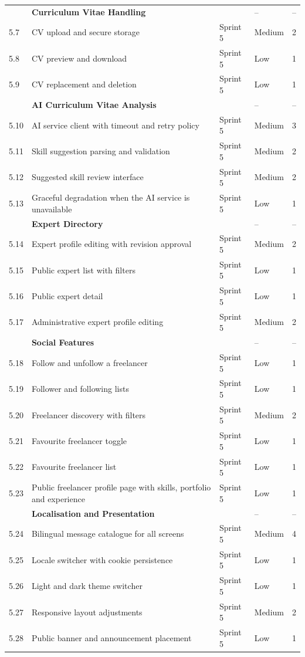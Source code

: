 \begin{longtable}{|
C{1.0cm}|
L{6.9cm}|
C{1.8cm}|
C{2.1cm}|
C{2.3cm}|}
 & \textbf{Curriculum Vitae Handling} &  & -- & -- \\
5.7 & CV upload and secure storage & Sprint 5 & Medium & 2 \\
5.8 & CV preview and download & Sprint 5 & Low & 1 \\
5.9 & CV replacement and deletion & Sprint 5 & Low & 1 \\
\hline

 & \textbf{AI Curriculum Vitae Analysis} &  & -- & -- \\
5.10 & AI service client with timeout and retry policy & Sprint 5 & Medium & 3 \\
5.11 & Skill suggestion parsing and validation & Sprint 5 & Medium & 2 \\
5.12 & Suggested skill review interface & Sprint 5 & Medium & 2 \\
5.13 & Graceful degradation when the AI service is unavailable & Sprint 5 & Low & 1 \\
\hline

 & \textbf{Expert Directory} &  & -- & -- \\
5.14 & Expert profile editing with revision approval & Sprint 5 & Medium & 2 \\
5.15 & Public expert list with filters & Sprint 5 & Low & 1 \\
5.16 & Public expert detail & Sprint 5 & Low & 1 \\
5.17 & Administrative expert profile editing & Sprint 5 & Medium & 2 \\
\hline

 & \textbf{Social Features} &  & -- & -- \\
5.18 & Follow and unfollow a freelancer & Sprint 5 & Low & 1 \\
5.19 & Follower and following lists & Sprint 5 & Low & 1 \\
5.20 & Freelancer discovery with filters & Sprint 5 & Medium & 2 \\
5.21 & Favourite freelancer toggle & Sprint 5 & Low & 1 \\
5.22 & Favourite freelancer list & Sprint 5 & Low & 1 \\
5.23 & Public freelancer profile page with skills, portfolio and experience & Sprint 5 & Low & 1 \\
\hline

 & \textbf{Localisation and Presentation} &  & -- & -- \\
5.24 & Bilingual message catalogue for all screens & Sprint 5 & Medium & 4 \\
5.25 & Locale switcher with cookie persistence & Sprint 5 & Low & 1 \\
5.26 & Light and dark theme switcher & Sprint 5 & Low & 1 \\
5.27 & Responsive layout adjustments & Sprint 5 & Medium & 2 \\
5.28 & Public banner and announcement placement & Sprint 5 & Low & 1 \\
\hline


\end{longtable}
